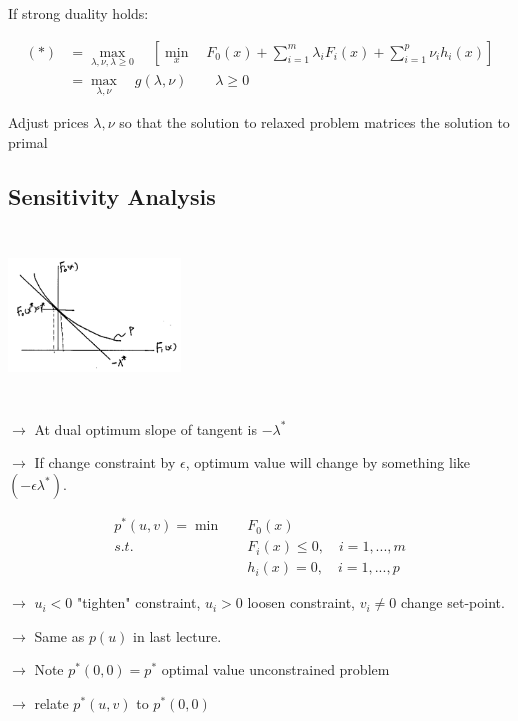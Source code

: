 If strong duality holds:

\begin{align*}
(*) &= \max_{\lambda, \nu, \lambda \geq 0}\quad [\min_x\quad F_0(x) + \sum^m_{i=1}\lambda_iF_i(x) + \sum^p_{i=1}\nu_ih_i(x)]\\
&= \max_{\lambda, \nu}\quad g(\lambda, \nu)\qquad \lambda \geq 0
\end{align*}

Adjust prices $\lambda, \nu$ so that the solution to relaxed problem matrices the solution to primal
\subsection{Sensitivity Analysis}

\begin{marginfigure}
\centering
\includegraphics[width=1.8in,height=1.8in]{figures/ch10/figure1127_4.png}
\end{marginfigure}

$\rightarrow$ At dual optimum slope of tangent is $-\lambda^*$

$\rightarrow$
 If change constraint by $\epsilon$, optimum value will change by something like $(-\epsilon \lambda^*)$.
 
 
\begin{align*}
p^*(u,v) = \min \quad &F_0(x) \\
s.t.\quad & F_i(x) \leq 0,\quad i = 1,...,m\\
& h_i(x) = 0,\quad i = 1,...,p
\end{align*}




$\rightarrow$ $u_i<0$ "tighten" constraint, $u_i>0$ loosen constraint, $v_i\neq 0$ change set-point.

$\rightarrow$ Same as $p(u)$ in last lecture.

$\rightarrow$ Note $p^*(0,0) = p^*$ optimal value unconstrained problem

$\rightarrow$ relate $p^*(u,v)$ to $p^*(0,0)$\\

